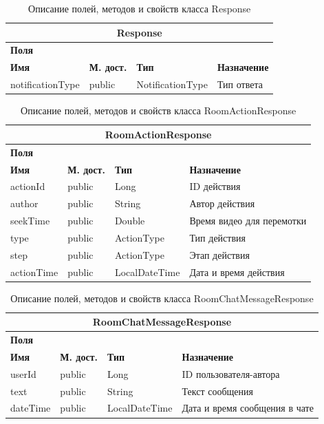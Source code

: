 \documentclass{../includes/TechDoc}
\begin{document}
    \begin{table}[h]
		\caption{\label{tab:class-WebsocketEventListener-table}Описание полей, методов и свойств класса Response}
	    \begin{tabularx}{\textwidth}{|l|l|l|X|}
	    	\hline
	  		\multicolumn{4}{|c|}{Response} \\ \hline
	  		\multicolumn{4}{|l|}{\textbf{Поля}} \\ \hline
	  		\textbf{Имя} & \textbf{М. дост.} & \textbf{Тип} & \textbf{Назначение} \\ \hline
			notificationType & public & NotificationType & Тип ответа \\ \hline
		\end{tabularx}
    \end{table}

    \begin{table}[h]
		\caption{\label{tab:class-WebsocketEventListener-table}Описание полей, методов и свойств класса RoomActionResponse}
	    \begin{tabularx}{\textwidth}{|l|l|l|X|}
	    	\hline
	  		\multicolumn{4}{|c|}{RoomActionResponse} \\ \hline
	  		\multicolumn{4}{|l|}{\textbf{Поля}} \\ \hline
	  		\textbf{Имя} & \textbf{М. дост.} & \textbf{Тип} & \textbf{Назначение} \\ \hline
			actionId & public & Long & ID действия \\ \hline
			author & public & String & Автор действия \\ \hline
			seekTime & public & Double & Время видео для перемотки \\ \hline
			type & public & ActionType & Тип действия \\ \hline
			step & public & ActionType & Этап действия \\ \hline
			actionTime & public & LocalDateTime & Дата и время действия \\ \hline
		\end{tabularx}
    \end{table}

    \begin{table}[h]
		\caption{\label{tab:class-WebsocketEventListener-table}Описание полей, методов и свойств класса RoomChatMessageResponse}
	    \begin{tabularx}{\textwidth}{|l|l|l|X|}
	    	\hline
	  		\multicolumn{4}{|c|}{RoomChatMessageResponse} \\ \hline
	  		\multicolumn{4}{|l|}{\textbf{Поля}} \\ \hline
	  		\textbf{Имя} & \textbf{М. дост.} & \textbf{Тип} & \textbf{Назначение} \\ \hline
			userId & public & Long & ID пользователя-автора \\ \hline
			text & public & String & Текст сообщения \\ \hline
			dateTime & public & LocalDateTime & Дата и время сообщения в чате \\ \hline
		\end{tabularx}
    \end{table}
\end{document}
